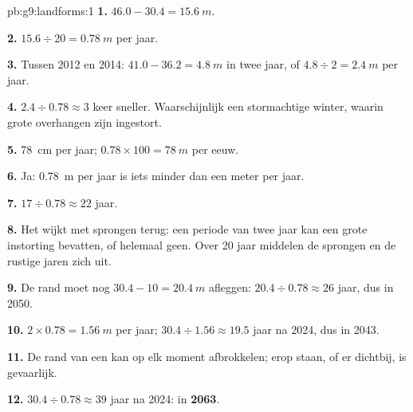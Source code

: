 \begin{solution}{pb:g9:landforms:1}
\textbf{1.} $46.0 - 30.4 = \qty{15.6}{m}$.

\textbf{2.} $15.6 \div 20 = \qty{0.78}{m}$ per jaar.

\textbf{3.} Tussen 2012 en 2014: $41.0 - 36.2 = \qty{4.8}{m}$ in twee
jaar, of $4.8 \div 2 = \qty{2.4}{m}$ per jaar.

\textbf{4.} $2.4 \div 0.78 \approx 3$ keer sneller. Waarschijnlijk een
stormachtige winter, waarin grote overhangen zijn ingestort.

\textbf{5.} \qty{78}{cm} per jaar; $0.78 \times 100 = \qty{78}{m}$ per
eeuw.

\textbf{6.} Ja: \qty{0.78}{m} per jaar is iets minder dan een meter per jaar.

\textbf{7.} $17 \div 0.78 \approx 22$ jaar.

\textbf{8.} Het  wijkt met sprongen terug: een periode van twee jaar kan
een grote instorting bevatten, of helemaal geen. Over 20 jaar middelen de
sprongen en de rustige jaren zich uit.

\textbf{9.} De rand moet nog $30.4 - 10 = \qty{20.4}{m}$ afleggen: $20.4 \div 0.78
\approx 26$ jaar, dus in 2050.

\textbf{10.} $2 \times 0.78 = \qty{1.56}{m}$ per jaar; $30.4 \div 1.56
\approx 19.5$ jaar na 2024, dus in 2043.

\textbf{11.} De rand van een  kan op elk moment afbrokkelen; erop
staan, of er dichtbij, is gevaarlijk.

\textbf{12.} $30.4 \div 0.78 \approx 39$ jaar na 2024: in
\textbf{2063}.
\end{solution}
